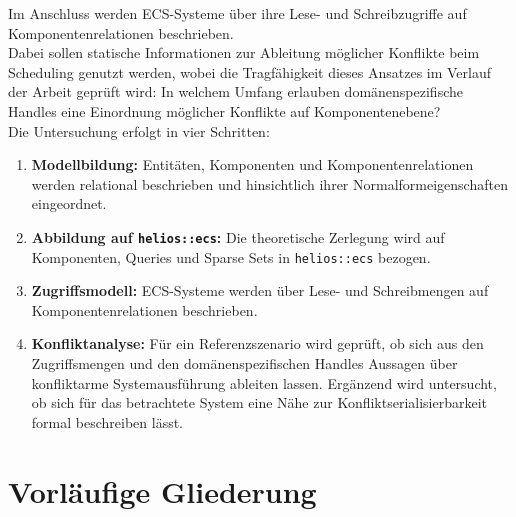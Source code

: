 Im Anschluss werden ECS-Systeme über ihre Lese- und Schreibzugriffe auf Komponentenrelationen beschrieben.\\
Dabei sollen statische Informationen zur Ableitung möglicher Konflikte beim Scheduling genutzt werden, wobei die Tragfähigkeit dieses Ansatzes im Verlauf der Arbeit geprüft wird: In welchem Umfang erlauben domänenspezifische Handles eine Einordnung möglicher Konflikte auf Komponentenebene?\\

Die Untersuchung erfolgt in vier Schritten:

\begin{enumerate}
    \item \textbf{Modellbildung:} Entitäten, Komponenten und Komponentenrelationen werden relational beschrieben und hinsichtlich ihrer Normalformeigenschaften eingeordnet.

    \item \textbf{Abbildung auf \texttt{helios::ecs}:} Die theoretische Zerlegung wird auf Komponenten, Queries und Sparse Sets in \texttt{helios::ecs} bezogen.

    \item \textbf{Zugriffsmodell:} ECS-Systeme werden über Lese- und Schreibmengen auf Komponentenrelationen beschrieben.

    \item \textbf{Konfliktanalyse:} Für ein Referenzszenario wird geprüft, ob sich aus den Zugriffsmengen und den domänenspezifischen Handles Aussagen über konfliktarme Systemausführung ableiten lassen.
    Ergänzend wird untersucht, ob sich für das betrachtete System eine Nähe zur Konfliktserialisierbarkeit formal beschreiben lässt.
\end{enumerate}


\section{Vorläufige Gliederung}

